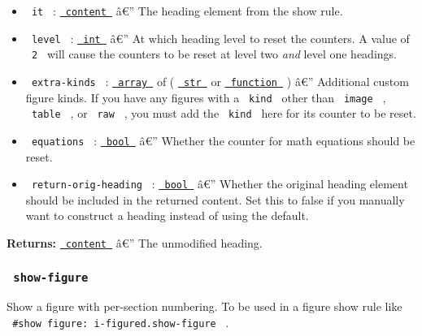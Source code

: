 \begin{itemize}
\tightlist
\item
  \texttt{\ it\ } :
  \href{https://typst.app/docs/reference/foundations/content/}{\texttt{\ content\ }}
  â€'' The heading element from the show rule.
\item
  \texttt{\ level\ } :
  \href{https://typst.app/docs/reference/foundations/int/}{\texttt{\ int\ }}
  â€'' At which heading level to reset the counters. A value of
  \texttt{\ 2\ } will cause the counters to be reset at level two
  \emph{and} level one headings.
\item
  \texttt{\ extra-kinds\ } :
  \href{https://typst.app/docs/reference/foundations/array/}{\texttt{\ array\ }}
  of (
  \href{https://typst.app/docs/reference/foundations/str/}{\texttt{\ str\ }}
  or
  \href{https://typst.app/docs/reference/foundations/function/}{\texttt{\ function\ }}
  ) â€'' Additional custom figure kinds. If you have any figures with a
  \texttt{\ kind\ } other than \texttt{\ image\ } , \texttt{\ table\ } ,
  or \texttt{\ raw\ } , you must add the \texttt{\ kind\ } here for its
  counter to be reset.
\item
  \texttt{\ equations\ } :
  \href{https://typst.app/docs/reference/foundations/bool/}{\texttt{\ bool\ }}
  â€'' Whether the counter for math equations should be reset.
\item
  \texttt{\ return-orig-heading\ } :
  \href{https://typst.app/docs/reference/foundations/bool/}{\texttt{\ bool\ }}
  â€'' Whether the original heading element should be included in the
  returned content. Set this to false if you manually want to construct
  a heading instead of using the default.
\end{itemize}

\textbf{Returns:}
\href{https://typst.app/docs/reference/foundations/content/}{\texttt{\ content\ }}
â€'' The unmodified heading.

\subsubsection{\texorpdfstring{\texttt{\ show-figure\ }}{ show-figure }}\label{show-figure}

Show a figure with per-section numbering. To be used in a figure show
rule like \texttt{\ \#show\ figure:\ i-figured.show-figure\ } .

\begin{Shaded}
\begin{Highlighting}[]
\end{Highlighting}
\end{Shaded}

